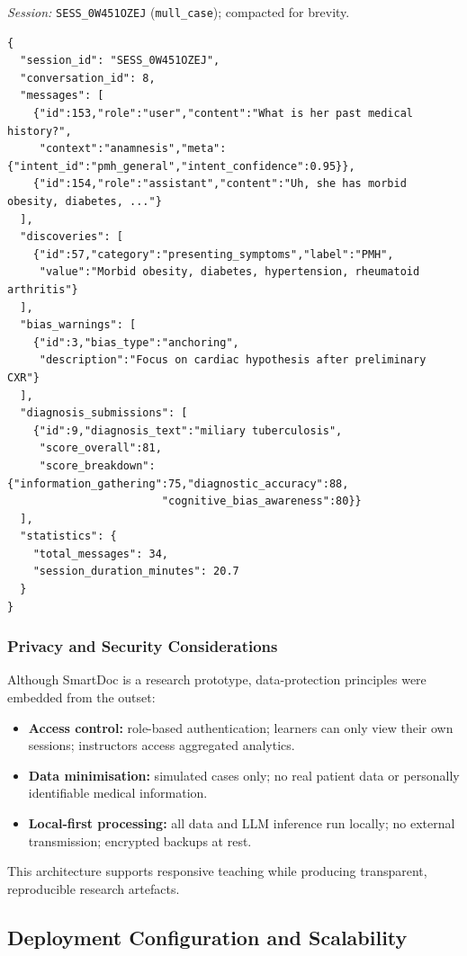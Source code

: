 \noindent\textit{Session:} \texttt{SESS\_0W451OZEJ} (\texttt{mull\_case}); compacted for brevity.
\begin{verbatim}
{
  "session_id": "SESS_0W451OZEJ",
  "conversation_id": 8,
  "messages": [
    {"id":153,"role":"user","content":"What is her past medical history?",
     "context":"anamnesis","meta":{"intent_id":"pmh_general","intent_confidence":0.95}},
    {"id":154,"role":"assistant","content":"Uh, she has morbid obesity, diabetes, ..."}
  ],
  "discoveries": [
    {"id":57,"category":"presenting_symptoms","label":"PMH",
     "value":"Morbid obesity, diabetes, hypertension, rheumatoid arthritis"}
  ],
  "bias_warnings": [
    {"id":3,"bias_type":"anchoring",
     "description":"Focus on cardiac hypothesis after preliminary CXR"}
  ],
  "diagnosis_submissions": [
    {"id":9,"diagnosis_text":"miliary tuberculosis",
     "score_overall":81,
     "score_breakdown":{"information_gathering":75,"diagnostic_accuracy":88,
                        "cognitive_bias_awareness":80}}
  ],
  "statistics": {
    "total_messages": 34,
    "session_duration_minutes": 20.7
  }
}
\end{verbatim}

\subsubsection{Privacy and Security Considerations}

Although SmartDoc is a research prototype, data-protection principles were
embedded from the outset:

\begin{itemize}
  \item \textbf{Access control:} role-based authentication; learners can only view their
        own sessions; instructors access aggregated analytics.
  \item \textbf{Data minimisation:} simulated cases only; no real patient data or
        personally identifiable medical information.

  \item \textbf{Local-first processing:} all data and LLM inference run locally;
        no external transmission; encrypted backups at rest.
\end{itemize}

This architecture supports responsive teaching while producing transparent,
reproducible research artefacts.

\subsection{Deployment Configuration and Scalability}
\label{sec:deploy}

